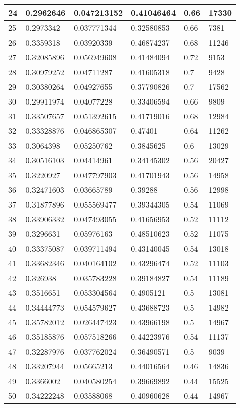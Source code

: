 \begin{longtable}{|l|l|l|l|l|l|}
24 & 0.2962646 & 0.047213152 & 0.41046464 & 0.66 & 17330 \\ \hline 
25 & 0.2973342 & 0.037771344 & 0.32580853 & 0.66 & 7381 \\ \hline 
26 & 0.3359318 & 0.03920339 & 0.46874237 & 0.68 & 11246 \\ \hline 
27 & 0.32085896 & 0.056949608 & 0.41484094 & 0.72 & 9153 \\ \hline 
28 & 0.30979252 & 0.04711287 & 0.41605318 & 0.7 & 9428 \\ \hline 
29 & 0.30380264 & 0.04927655 & 0.37790826 & 0.7 & 17562 \\ \hline 
30 & 0.29911974 & 0.04077228 & 0.33406594 & 0.66 & 9809 \\ \hline 
31 & 0.33507657 & 0.051392615 & 0.41719016 & 0.68 & 12984 \\ \hline 
32 & 0.33328876 & 0.046865307 & 0.47401 & 0.64 & 11262 \\ \hline 
33 & 0.3064398 & 0.05250762 & 0.3845625 & 0.6 & 13029 \\ \hline 
34 & 0.30516103 & 0.04414961 & 0.34145302 & 0.56 & 20427 \\ \hline 
35 & 0.3220927 & 0.047797903 & 0.41701943 & 0.56 & 14958 \\ \hline 
36 & 0.32471603 & 0.03665789 & 0.39288 & 0.56 & 12998 \\ \hline 
37 & 0.31877896 & 0.055569477 & 0.39344305 & 0.54 & 11069 \\ \hline 
38 & 0.33906332 & 0.047493055 & 0.41656953 & 0.52 & 11112 \\ \hline 
39 & 0.3296631 & 0.05976163 & 0.48510623 & 0.52 & 11075 \\ \hline 
40 & 0.33375087 & 0.039711494 & 0.43140045 & 0.54 & 13018 \\ \hline 
41 & 0.33682346 & 0.040164102 & 0.43296474 & 0.52 & 11103 \\ \hline 
42 & 0.326938 & 0.035783228 & 0.39184827 & 0.54 & 11189 \\ \hline 
43 & 0.3516651 & 0.053304564 & 0.4905121 & 0.5 & 13081 \\ \hline 
44 & 0.34444773 & 0.054579627 & 0.43688723 & 0.5 & 14982 \\ \hline 
45 & 0.35782012 & 0.026447423 & 0.43966198 & 0.5 & 14967 \\ \hline 
46 & 0.35185876 & 0.057518266 & 0.44223976 & 0.54 & 11137 \\ \hline 
47 & 0.32287976 & 0.037762024 & 0.36490571 & 0.5 & 9039 \\ \hline 
48 & 0.33207944 & 0.05665213 & 0.44016564 & 0.46 & 14836 \\ \hline 
49 & 0.3366002 & 0.040580254 & 0.39669892 & 0.44 & 15525 \\ \hline 
50 & 0.34222248 & 0.03588068 & 0.40960628 & 0.44 & 14967 \\ \hline 
\end{longtable}